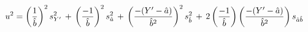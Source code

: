 \documentclass[12pt]{article}
\begin{document}
\pagestyle{empty}
\Large
{}
\pagecolor{ehandbook}


\[
\hspace{-.25in}u^2 =
\left( \frac{1}{\hat{b}} \right)^2 s_{Y'}^2 \, + \, 
\left( \frac{-1}{\hat{b}} \right)^2 s_{\hat{a}}^2 \, + \, 
\left( \frac{-(Y'-\hat{a})}{\hat{b}^{2}} \right)^2  s_{\hat{b}}^2 \, + \,
2 \left( \frac{-1}{\hat{b}} \right) 
  \left( \frac{-(Y'-\hat{a})}{\hat{b}^{2}} \right) s_{\hat{a}\hat{b}}
\]
\end{document}

